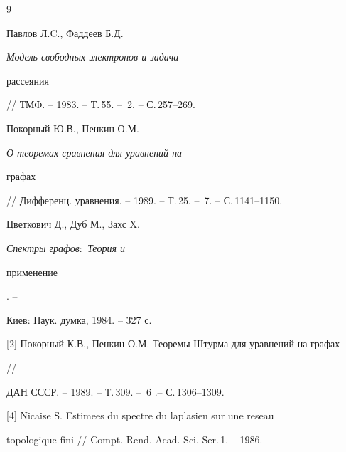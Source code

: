 \begin{thebibliography}{9} 


 




Павлов Л.C., Фаддеев Б.Д. {\em Модель свободных электронов и задача 


рассеяния} 


// ТМФ. -- 1983. -- Т.\,55. -- \No\,2. -- С.\,257--269. 




Покорный Ю.В., Пенкин О.М. {\em О теоремах сравнения для уравнений на 


графах} 


// Дифференц. уравнения. -- 1989. -- Т.\,25. -- \No\,7. -- С.\,1141--1150. 




Цветкович Д., Дуб М., Захс X. {\em Спектры графов$:$ Теория и 


применение}. -- 


Киев: Наук. думка, 1984. -- 327 с. 


 


\end{thebibliography} 


 


\vskip 2cm 


 






 


\label{end} 


 


 


 




[2] Покорный К.В., Пенкин О.М. Теоремы Штурма для уравнений на графах 


// 


ДАН СССР. -- 1989. -- Т.\,309. -- \No\,6 .-- С.\,1306--1309. 


 


[4] Nicaise S. Estimees du spectre du laplasien sur une reseau 


topologique fini // Compt. Rend. Acad. Sci. Ser.\,1. -- 1986. -- 


